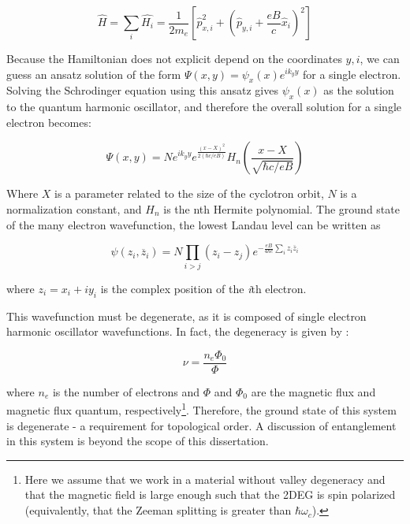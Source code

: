 \begin{equation}
\hat{H} = \sum_{i} \hat{H_{i}} = \frac{1}{2m_{e}} \left[ \hat{p}_{x,i}^{2} + \left(\hat{p}_{y,i} + \frac{eB}{c} \hat{x}_{i} \right)^{2} \right]
\end{equation}

Because the Hamiltonian does not explicit depend on the coordinates $y,i$, we can guess an ansatz solution of the form $\Psi(x,y) = \psi_{x}(x) e^{ik_{y}y}$ for a single electron. Solving the Schrodinger equation using this ansatz gives $\psi_{x}(x)$ as the solution to the quantum harmonic oscillator, and therefore the overall solution for a single electron becomes:

\begin{equation}
\Psi(x,y) = N e^{ik_{y}y}e^{\frac{(x-X)^{2}}{2(\hbar c/eB)}} H_{n} \left(\frac{x-X}{\sqrt{\hbar c/ eB}} \right)
\end{equation}

Where $X$ is a parameter related to the size of the cyclotron orbit, $N$ is a normalization constant, and $H_{n}$ is the nth Hermite polynomial. The ground state of the many electron wavefunction, the lowest Landau level can be written as \cite{Yoshioka2002}

\begin{equation} \label{psi-el}
\psi(z_{i},\overline{z}_{i}) = N \prod_{i > j} (z_{i} - z_{j}) e^{-\frac{eB}{4 \hbar c} \sum_{i} z_{i} \overline{z}_{i}}
\end{equation}

where $z_{i} = x_{i} + iy_{i}$ is the complex position of the \textit{i}th electron.

This wavefunction must be degenerate, as it is composed of single electron harmonic oscillator wavefunctions. In fact, the degeneracy is given by \cite{Chakraborty1995}:

\begin{equation}
\nu = \frac{n_{e}\Phi_{0}}{\Phi}
\end{equation}

where $n_{e}$ is the number of electrons and $\Phi$ and $\Phi_{0}$ are the magnetic flux and magnetic flux quantum, respectively\footnote{Here we assume that we work in a material without valley degeneracy and that the magnetic field is large enough such that the 2DEG is spin polarized (equivalently, that the Zeeman splitting is greater than $\hbar \omega_{c}$).}. Therefore, the ground state of this system is degenerate - a requirement for topological order. A discussion of entanglement in this system is beyond the scope of this dissertation.

